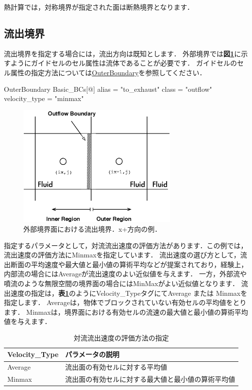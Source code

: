 熱計算では，対称境界が指定された面は断熱境界となります．


\pagebreak
\subsection{流出境界}

流出境界を指定する場合には，流出方向は既知とします．
外部境界では\textbf{図\ref{fig:outflow BC outer}}に示すようにガイドセルのセル属性は流体であることが必要です．
ガイドセルのセル属性の指定方法については\hyperlink{tgt:outer_boundary}{OuterBoundary}を参照してください．

{\small
\begin{program}
OuterBoundary {
  Basic_BCs[@] {
    alias    = "to_exhaust"
    class    = "outflow"
    velocity_type = "minmax"
  }
}
\end{program}
}

\begin{figure}[htbp]
\begin{center}
\includegraphics[width=8cm,clip]{outflowBC_outer.eps}
\end{center}
\caption{外部境界面における流出境界．x+方向の例．}
\label{fig:outflow BC outer}
\end{figure}

\noindent 指定するパラメータとして，対流流出速度の評価方法があります．この例では，流出速度の評価方法にMinmaxを指定しています．
流出速度の選び方として，流出断面の平均速度や最大値と最小値の算術平均などが提案されており，経験上，内部流の場合にはAverageが流出速度のよい近似値を与えます．
一方，外部流や噴流のような無限空間の境界面の場合にはMinMaxがよい近似値となります．
流出速度の指定は，\textbf{表\ref{tbl:outflow velocity}}のようにVelocity\_TypeタグにてAverage または Minmaxを指定します．
Averageは，物体でブロックされていない有効セルの平均値をとります．
Minmaxは，境界面における有効セルの流速の最大値と最小値の算術平均値を与えます．

\begin{table}[htdp]
\caption{対流流出速度の評価方法の指定}
\begin{center}
\small
\begin{tabular}{ll} \toprule
Velocity\_Type & パラメータの説明\\ \midrule
Average & 流出面の有効セルに対する平均値\\
Minmax & 流出面の有効セルに対する最大値と最小値の算術平均値\\ \bottomrule
\end{tabular}
\end{center}
\label{tbl:outflow velocity}
\end{table}

